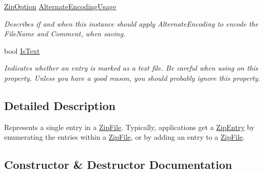 \begin{DoxyCompactItemize}
\mbox{\hyperlink{namespace_super_tiled2_unity_1_1_ionic_1_1_zip_a25d431031427c142eba970006eee630c}{Zip\+Option}} \mbox{\hyperlink{class_super_tiled2_unity_1_1_ionic_1_1_zip_1_1_zip_entry_a972512ebe8d25c895ad0d67e75e24bfb}{Alternate\+Encoding\+Usage}}
\begin{DoxyCompactList}\small\item\em Describes if and when this instance should apply Alternate\+Encoding to encode the File\+Name and Comment, when saving. \end{DoxyCompactList}\item 
bool \mbox{\hyperlink{class_super_tiled2_unity_1_1_ionic_1_1_zip_1_1_zip_entry_a04adaebb58e53fedd580cfa10fd1c7a9}{Is\+Text}}
\begin{DoxyCompactList}\small\item\em Indicates whether an entry is marked as a text file. Be careful when using on this property. Unless you have a good reason, you should probably ignore this property. \end{DoxyCompactList}\end{DoxyCompactItemize}


\subsection{Detailed Description}
Represents a single entry in a \mbox{\hyperlink{class_super_tiled2_unity_1_1_ionic_1_1_zip_1_1_zip_file}{Zip\+File}}. Typically, applications get a \mbox{\hyperlink{class_super_tiled2_unity_1_1_ionic_1_1_zip_1_1_zip_entry}{Zip\+Entry}} by enumerating the entries within a \mbox{\hyperlink{class_super_tiled2_unity_1_1_ionic_1_1_zip_1_1_zip_file}{Zip\+File}}, or by adding an entry to a \mbox{\hyperlink{class_super_tiled2_unity_1_1_ionic_1_1_zip_1_1_zip_file}{Zip\+File}}. 



\subsection{Constructor \& Destructor Documentation}
\mbox{\label{class_super_tiled2_unity_1_1_ionic_1_1_zip_1_1_zip_entry_a440b6d4d136b20dc6bdbdd399397e3a0}} 
